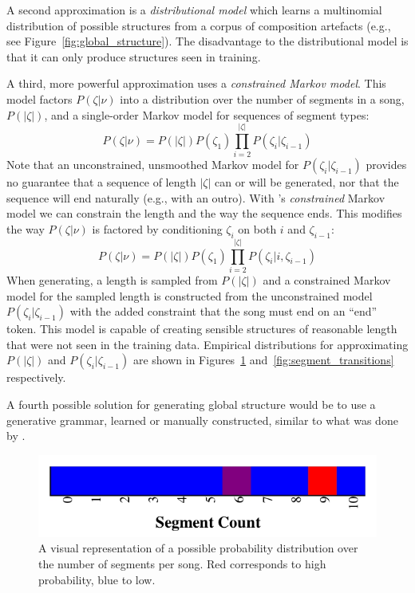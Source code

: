 \documentclass[phd,electronic,oneside,twosidetoc,letterpaper,chaptercenter,parttop,lol,lof,lot]{byumsphd}
\begin{document}
A second approximation is a \textit{distributional model} which learns a multinomial distribution of possible structures from a corpus of composition artefacts (e.g., see Figure~\ref{fig:global_structure}). The disadvantage to the distributional model is that it can only produce structures seen in training. 

A third, more powerful approximation uses a \textit{constrained Markov model}. This model factors $P(\zeta|\nu)$ into a distribution over the number of segments in a song, $P(|\zeta|)$, and a single-order Markov model for sequences of segment types:
\[ P(\zeta|\nu) = P(|\zeta|) P(\zeta_1) \prod_{i=2}^{|\zeta|} P(\zeta_i|\zeta_{i-1}) \]
\noindent Note that an unconstrained, unsmoothed Markov model for $P(\zeta_i|\zeta_{i-1})$ provides no guarantee that a sequence of length $|\zeta|$ can or will be generated, nor that the sequence will end naturally (e.g., with an outro). With \citeauthor{pachet2011finite}'s \emph{constrained} Markov model we can constrain the length and the way the sequence ends. This modifies the way $P(\zeta|\nu)$ is factored by conditioning $\zeta_i$ on both $i$ and $\zeta_{i-1}$:
\[ P(\zeta|\nu) = P(|\zeta|) P(\zeta_1) \prod_{i=2}^{|\zeta|} P(\zeta_i|i,\zeta_{i-1}) \]
When generating, a length is sampled from $P(|\zeta|)$ and a constrained Markov model for the sampled length is constructed from the unconstrained model $P(\zeta_i|\zeta_{i-1})$ with the added constraint that the song must end on an ``end'' token. This model is capable of creating sensible structures of reasonable length that were not seen in the training data. Empirical distributions for approximating $P(|\zeta|)$ and $P(\zeta_i|\zeta_{i-1})$ are shown in Figures~\ref{fig:segment_count_per_song} and~\ref{fig:segment_transitions} respectively.

A fourth possible solution for generating global structure would be to use a generative grammar, learned or manually constructed, similar to what was done by \cite{steedman1984generative}.

\begin{figure}
	\centering
	\includegraphics[width=.8\linewidth]{segment_count_per_song}
	\caption{\label{fig:segment_count_per_song} A visual representation of a possible probability distribution over the number of segments per song. Red corresponds to high probability, blue to low.}
\end{figure}
\end{document}
